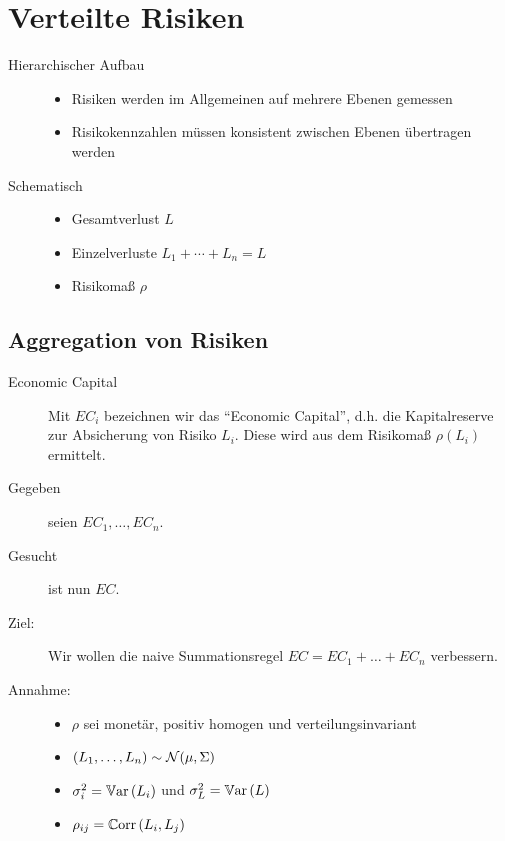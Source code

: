 \section{Verteilte Risiken}

\begin{description}
	\item[Hierarchischer Aufbau]
	
	\begin{itemize}[nolistsep]
		\item Risiken werden im Allgemeinen auf mehrere Ebenen gemessen
		\item Risikokennzahlen müssen konsistent zwischen Ebenen übertragen werden
	\end{itemize}
	
	\item[Schematisch]
	\begin{itemize}[nolistsep]
		\item Gesamtverlust $L$
		\item Einzelverluste $L_1 + \cdots + L_n = L$
		\item Risikomaß $\rho$
	\end{itemize}
\end{description}


\subsection{Aggregation von Risiken}
\begin{description}
	\item[Economic Capital] Mit $EC_i$ bezeichnen wir das \enquote{Economic Capital}, d.h. die Kapitalreserve zur Absicherung von Risiko $L_i$. Diese wird aus dem Risikomaß $\rho(L_i)$ ermittelt.
	
	\item[Gegeben] seien $EC_1, \dots, EC_n$. 
	\item[Gesucht] ist nun $EC$.
	
	\item[Ziel:] Wir wollen die naive Summationsregel $EC = EC_1 + \dots + EC_n$ verbessern.
	
	\item[Annahme:] 
	\begin{itemize}[nolistsep]
		\item $\rho$ sei monetär, positiv homogen und verteilungsinvariant
		\item $(L_1, \dots, L_n) \sim \Normal(\mu, \Sigma)$
		\item $\sigma_i^2 = \Var[L_i]$ und $\sigma_L^2 = \Var[L]$
		\item $\rho_{ij} = \Corr{L_i}{L_j}$
	\end{itemize}
\end{description}


